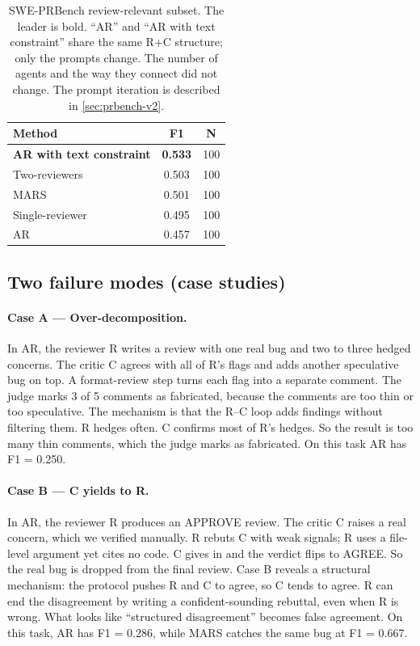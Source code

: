 \documentclass{article}
\begin{document}
\begin{table}[t]
\centering
\small
\caption{SWE-PRBench review-relevant subset. The leader is bold. ``AR'' and
``AR with text constraint'' share the same R+C structure; only the prompts
change. The number of agents and the way they connect did not change. The
prompt iteration is described in \autoref{sec:prbench-v2}.\label{tab:prbench-subset}}
\begin{tabular}{l|cc}
\toprule
Method                & F1  & N \\
\midrule
\textbf{AR with text constraint} & \textbf{0.533} & 100 \\
Two-reviewers         & 0.503    & 100 \\
MARS                  & 0.501    & 100 \\
Single-reviewer       & 0.495    & 100 \\
AR                    & 0.457    & 100 \\
\bottomrule
\end{tabular}
\end{table}

\subsection{Two failure modes (case studies)}
\label{sec:prbench-cases}

\paragraph{Case A — Over-decomposition.}
In AR, the reviewer R writes a review with one real bug and two to three hedged
concerns. The critic C agrees with all of R's flags and adds another
speculative bug on top. A format-review step turns each flag into a
separate comment. The judge marks 3 of 5 comments as fabricated,
because the comments are too thin or too speculative.
The mechanism is that the R--C loop adds findings without filtering
them. R hedges often. C confirms most of R's hedges. So the result is
too many thin comments, which the judge marks as fabricated. On this
task AR has F1 = 0.250.

\paragraph{Case B — C yields to R.}
In AR, the reviewer R produces an APPROVE review. The critic C raises a real concern, which we verified manually. R rebuts C with weak signals; R
uses a file-level argument yet cites no code. C gives in
and the verdict flips to AGREE. So the real bug is dropped from the
final review. Case B reveals a structural mechanism: the protocol pushes R and C to
agree, so C tends to agree. R can end the disagreement by writing a
confident-sounding rebuttal, even when R is wrong. What looks like
``structured disagreement'' becomes false agreement. On this task, AR has
F1 = 0.286, while MARS catches the same bug at F1 = 0.667.
\end{document}
